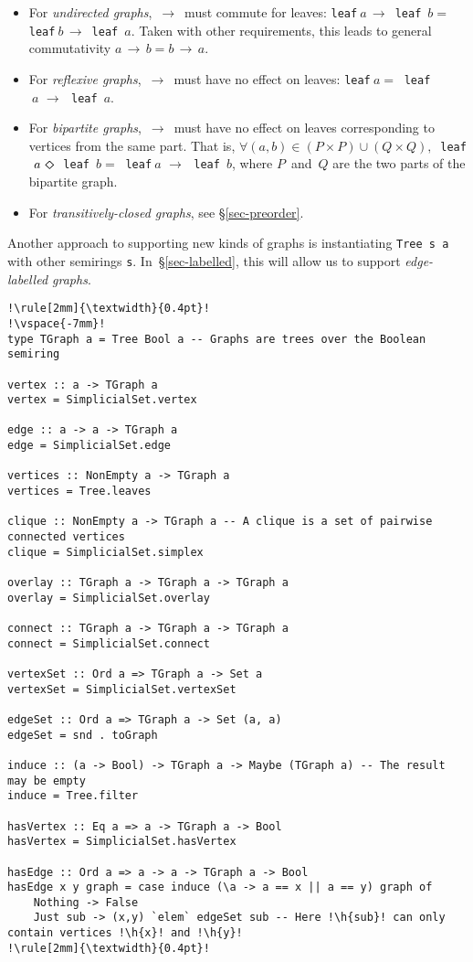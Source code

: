 \documentclass[english,submission]{programming}
\newcommand{\code}[1]{\lstinline[mathescape]|#1|}
\newcommand{\hcode}[1]{{\color{darkblue} \lstinline[keywordstyle={}]|#1|}} %
\newcommand{\h}[1]{{\itshape\color{grayblue}#1}} %
\newcommand{\dia}{\,\text{\raisebox{-0.3mm}{\Large $\diamond$}}\,}
\newcommand{\arr}{\,\text{$\rightarrow$}\,}
\begin{document}
\begin{itemize}
    \item For \emph{undirected graphs}, $\arr$ must commute for leaves:
    \hcode{leaf}$~a \arr $\hcode{leaf}~$b =~$\hcode{leaf}$~b \arr $\hcode{leaf}~$a$.
    Taken with other requirements, this leads to general commutativity
    $a \arr b = b \arr a$.
    \item For \emph{reflexive graphs}, $\arr$ must have no effect on leaves:
    \hcode{leaf}$~a =~$\hcode{leaf}$~a\,\arr\,$\hcode{leaf}~$a$.
    \item For \emph{bipartite graphs}, $\arr$ must have no effect on leaves
    corresponding to vertices from the same part. That is,
    $\forall (a,b) \in (P \times P) \cup (Q \times Q),\ $\hcode{leaf}$~a\,\dia\,$\hcode{leaf}~$b =~$\hcode{leaf}$~a\,\arr\,$\hcode{leaf}~$b$,
    where $P$~and~$Q$ are the two parts of the bipartite graph.
    \item For \emph{transitively-closed graphs}, see \S\ref{sec-preorder}.
\end{itemize}

\noindent
Another approach to supporting new kinds of graphs is instantiating
\hcode{Tree s a} with other semirings \hcode{s}. In~\S\ref{sec-labelled}, this
will allow us to support \emph{edge-labelled graphs}.

\begin{lstlisting}[float,label=lst-graph,xleftmargin=0pt,caption={
    Implementing a part of the \code{Algebra.G}\code{raph} API~\cite{mokhov_alga}
    with \hcode{Tree Bool a}.
}]
!\rule[2mm]{\textwidth}{0.4pt}!
!\vspace{-7mm}!
type TGraph a = Tree Bool a -- Graphs are trees over the Boolean semiring

vertex :: a -> TGraph a
vertex = SimplicialSet.vertex

edge :: a -> a -> TGraph a
edge = SimplicialSet.edge

vertices :: NonEmpty a -> TGraph a
vertices = Tree.leaves

clique :: NonEmpty a -> TGraph a -- A clique is a set of pairwise connected vertices
clique = SimplicialSet.simplex

overlay :: TGraph a -> TGraph a -> TGraph a
overlay = SimplicialSet.overlay

connect :: TGraph a -> TGraph a -> TGraph a
connect = SimplicialSet.connect

vertexSet :: Ord a => TGraph a -> Set a
vertexSet = SimplicialSet.vertexSet

edgeSet :: Ord a => TGraph a -> Set (a, a)
edgeSet = snd . toGraph

induce :: (a -> Bool) -> TGraph a -> Maybe (TGraph a) -- The result may be empty
induce = Tree.filter

hasVertex :: Eq a => a -> TGraph a -> Bool
hasVertex = SimplicialSet.hasVertex

hasEdge :: Ord a => a -> a -> TGraph a -> Bool
hasEdge x y graph = case induce (\a -> a == x || a == y) graph of
    Nothing -> False
    Just sub -> (x,y) `elem` edgeSet sub -- Here !\h{sub}! can only contain vertices !\h{x}! and !\h{y}!
!\rule[2mm]{\textwidth}{0.4pt}!
\end{lstlisting}
\end{document}
